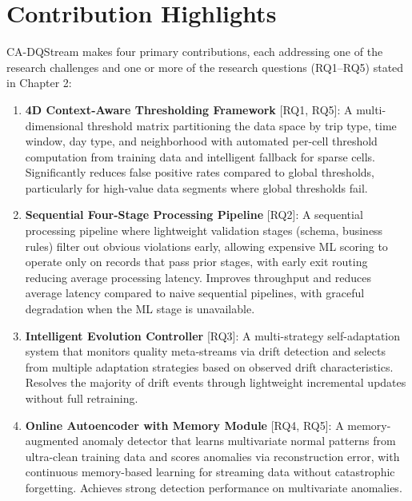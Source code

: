 \section{Contribution Highlights}

CA-DQStream makes four primary contributions, each addressing one of the research challenges and one or more of the research questions (RQ1--RQ5) stated in Chapter 2:

\begin{enumerate}
    \item \textbf{4D Context-Aware Thresholding Framework} [RQ1, RQ5]: A multi-dimensional threshold matrix partitioning the data space by trip type, time window, day type, and neighborhood with automated per-cell threshold computation from training data and intelligent fallback for sparse cells. Significantly reduces false positive rates compared to global thresholds, particularly for high-value data segments where global thresholds fail.

    \item \textbf{Sequential Four-Stage Processing Pipeline} [RQ2]: A sequential processing pipeline where lightweight validation stages (schema, business rules) filter out obvious violations early, allowing expensive ML scoring to operate only on records that pass prior stages, with early exit routing reducing average processing latency. Improves throughput and reduces average latency compared to naive sequential pipelines, with graceful degradation when the ML stage is unavailable.

    \item \textbf{Intelligent Evolution Controller} [RQ3]: A multi-strategy self-adaptation system that monitors quality meta-streams via drift detection and selects from multiple adaptation strategies based on observed drift characteristics. Resolves the majority of drift events through lightweight incremental updates without full retraining.

    \item \textbf{Online Autoencoder with Memory Module} [RQ4, RQ5]: A memory-augmented anomaly detector that learns multivariate normal patterns from ultra-clean training data and scores anomalies via reconstruction error, with continuous memory-based learning for streaming data without catastrophic forgetting. Achieves strong detection performance on multivariate anomalies.
\end{enumerate}

